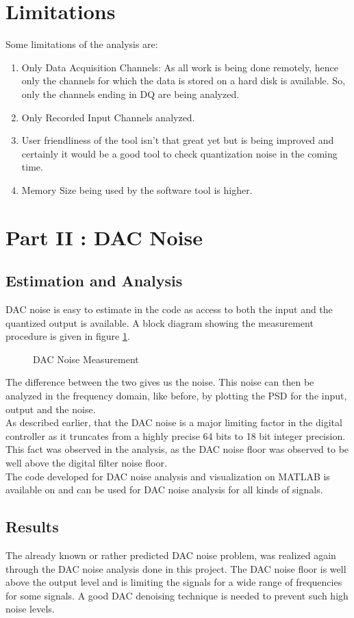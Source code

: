\documentclass[a4paper,12pt]{article}
\begin{document}
	\section{Limitations}
	Some limitations of the analysis are:
		\begin{enumerate}
			\item Only Data Acquisition Channels: As all work is being done remotely, hence only the channels for which the data is stored on a hard disk is available. So, only the channels ending in \textunderscore DQ are being analyzed.
			\item Only Recorded Input Channels analyzed.
			\item User friendliness of the tool isn't that great yet but is being improved and certainly it would be a good tool to check quantization noise in the coming time.
			\item Memory Size being used by the software tool is higher.
		\end{enumerate}	
\section{Part II : DAC Noise}
\label{dac}
	\subsection{Estimation and Analysis}
		DAC noise is easy to estimate in the code as access to both the input and the quantized output is available. A block diagram showing the measurement procedure is given in figure \ref{mea}.
		\begin{figure}[H]
  		\centering
  		\def\svgscale{0.5}
  		\tiny{
  		
  		}
  		\caption{DAC Noise Measurement}
		\label{mea}
		\end{figure}
		The difference between the two gives us the noise. This noise can then be analyzed in the frequency domain, like before, by plotting the PSD for the input, output and the noise. \\As described earlier, that the DAC noise is a major limiting factor in the digital controller as it truncates from a highly precise 64 bits to 18 bit integer precision. This fact was observed in the analysis, as the DAC noise floor was observed to be well above the digital filter noise floor. 
		\\The code developed for DAC noise analysis and visualization on MATLAB is available on \cite{Git} and can be used for DAC noise analysis for all kinds of signals. 
    \subsection{Results}
    The already known or rather predicted DAC noise problem, was realized again through the DAC noise analysis done in this project. The DAC noise floor is well above the output level and is limiting the signals for a wide range of frequencies for some signals. A good DAC denoising technique is needed to prevent such high noise levels. 
\end{document}
